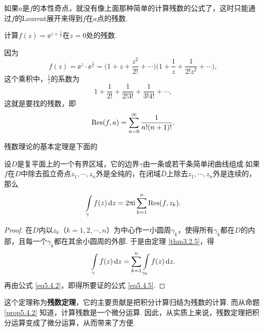 如果$a$是$f$的本性奇点，就没有像上面那种简单的计算残数的公式了，这时只能通过$f$的Laurent展开来得到$f$在$a$点的残数.

\begin{example}\label{exam5.4.8}
  计算$f(z)=\ee^{z+\frac1z}$在$z=0$处的残数.
\end{example}
\begin{solution}
  因为
  \[
    f(z) = \ee^z\cdot\ee^{\frac1z} = 
   \bigg(1 + z + \frac{z^2}{2!} + \cdots \bigg)\bigg(1 + \frac1z + \frac1{2!z^2} + \cdots \bigg),
  \]
  这个乘积中，$\frac1z$的系数为
  \[
    1 + \frac1{2!} + \frac1{2!3!} + \frac1{3!4!} + \cdots,
  \]
  这就是要找的残数，即
  \begin{equation*}
    \operatorname*{Res}(f,a) = \sum_{n=0}^\infty\frac1{n!(n+1)!}. \qedhere
  \end{equation*}
\end{solution}

残数理论的基本定理是下面的
\begin{theorem}\label{thm5.4.9}
  设$D$是复平面上的一个有界区域，它的边界$\gamma$由一条或若干条简单闭曲线组成.如果$f$在$D$中除去孤立奇点$z_1,\cdots,z_n$外是全纯的，在闭域$\bar D$上除去$z_1,\cdots,z_n$外是连续的，那么
  \begin{equation}\label{eq5.4.5}
    \int\limits_\gamma f(z)\mathop{}\!\mathrm dz = 2\uppi\mathrm i\sum_{k=1}^n\operatorname*{Res}(f,z_k).
  \end{equation}
\end{theorem}
\begin{proof}
  在$D$内以$z_k$（$k=1,2,\cdots,n$）为中心作一小圆周$\gamma_k$，使得所有$\gamma_k$都在$D$的内部，且每一个$\gamma_k$都在其余小圆周的外部. 于是由定理 \ref{thm3.2.5}，得
  \[
    \int\limits_\gamma f(z)\mathop{}\!\mathrm dz = \sum_{k=1}^n\int\limits_{\gamma_k}f(z)\mathop{}\!\mathrm dz.
  \]
  再由公式 \eqref{eq5.4.2}，即得所要证的公式 \eqref{eq5.4.5}.
\end{proof}

这个定理称为\textbf{残数定理}，它的主要贡献是把积分计算归结为残数的计算. 而从命题 \ref{prop5.4.2} 知道，计算残数是一个微分运算. 因此，从实质上来说，残数定理把积分运算变成了微分运算，从而带来了方便.


